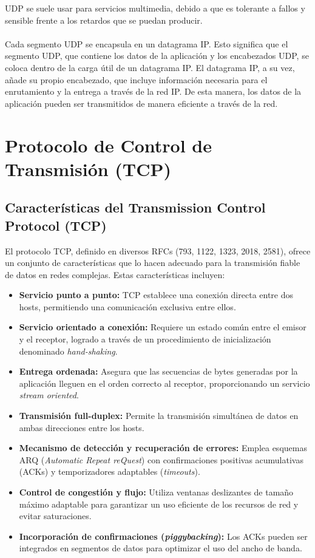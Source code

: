 \documentclass[a4paper,12pt]{article}
\begin{document}
UDP se suele usar para servicios multimedia, debido a que es tolerante a fallos y sensible frente a los retardos que se puedan producir.\\\\
Cada segmento UDP se encapsula en un datagrama IP. Esto significa que el segmento UDP, que contiene los datos de la aplicación y los encabezados UDP, se coloca dentro de la carga útil de un datagrama IP. El datagrama IP, a su vez, añade su propio encabezado, que incluye información necesaria para el enrutamiento y la entrega a través de la red IP. De esta manera, los datos de la aplicación pueden ser transmitidos de manera eficiente a través de la red.

\section{Protocolo de Control de Transmisión (TCP)}

\subsection*{Características del Transmission Control Protocol (TCP)}

El protocolo TCP, definido en diversos RFCs (793, 1122, 1323, 2018, 2581), ofrece un conjunto de características que lo hacen adecuado para la transmisión fiable de datos en redes complejas. Estas características incluyen:

\begin{itemize}
    \item \textbf{Servicio punto a punto:} TCP establece una conexión directa entre dos hosts, permitiendo una comunicación exclusiva entre ellos.
    \item \textbf{Servicio orientado a conexión:} Requiere un estado común entre el emisor y el receptor, logrado a través de un procedimiento de inicialización denominado \textit{hand-shaking}.
    \item \textbf{Entrega ordenada:} Asegura que las secuencias de bytes generadas por la aplicación lleguen en el orden correcto al receptor, proporcionando un servicio \textit{stream oriented}.
    \item \textbf{Transmisión full-duplex:} Permite la transmisión simultánea de datos en ambas direcciones entre los hosts.
    \item \textbf{Mecanismo de detección y recuperación de errores:} Emplea esquemas ARQ (\textit{Automatic Repeat reQuest}) con confirmaciones positivas acumulativas (ACKs) y temporizadores adaptables (\textit{timeouts}).
    \item \textbf{Control de congestión y flujo:} Utiliza ventanas deslizantes de tamaño máximo adaptable para garantizar un uso eficiente de los recursos de red y evitar saturaciones.
    \item \textbf{Incorporación de confirmaciones (\textit{piggybacking}):} Los ACKs pueden ser integrados en segmentos de datos para optimizar el uso del ancho de banda.
\end{itemize}
\end{document}
